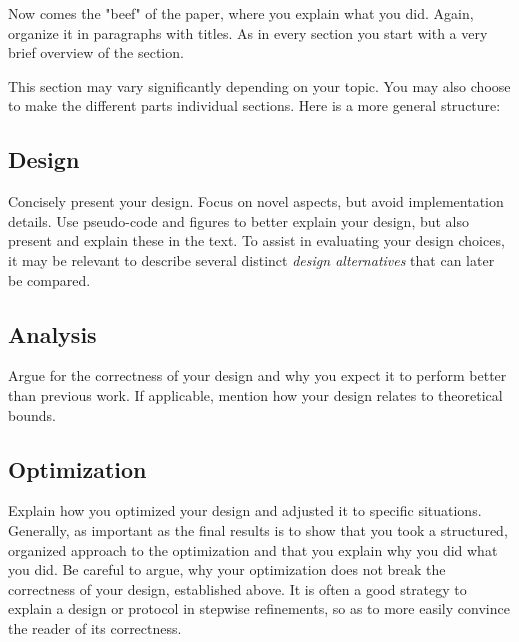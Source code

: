 Now comes the "beef" of the paper, where you explain what
you did. Again, organize it in paragraphs with titles. As in
every section you start with a very brief overview of the
section. 

This section may vary significantly depending on your topic.
You may also choose to make the different parts individual sections.
Here is a more general structure:

\subsection{Design} Concisely present your design. Focus on novel aspects,
but avoid implementation details. Use pseudo-code and figures to better
explain your design, but also present and explain these in the text.
%
To assist in evaluating your design choices, it may be relevant to describe
several distinct \textit{design alternatives} that can later be compared.

\subsection{Analysis} Argue for the correctness of your design and 
why you expect it to perform better than previous work.
%
If applicable, mention how your design relates to theoretical bounds.

\subsection{Optimization} Explain how you optimized your design and 
adjusted it to specific situations.
%
Generally, as important as the final results is to show
that you took a structured, organized approach to the optimization
and that you explain why you did what you did.
%
Be careful to argue, why your optimization does not break the 
correctness of your design, established above.
%
It is often a good strategy to explain a design or protocol in stepwise refinements,
so as to more easily convince the reader of its correctness. 

